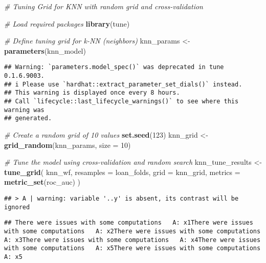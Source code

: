 \documentclass[
]{article}
\newenvironment{Shaded}{\begin{snugshade}}{\end{snugshade}}
\newcommand{\AttributeTok}[1]{\textcolor[rgb]{0.13,0.29,0.53}{#1}}
\newcommand{\CommentTok}[1]{\textcolor[rgb]{0.56,0.35,0.01}{\textit{#1}}}
\newcommand{\DecValTok}[1]{\textcolor[rgb]{0.00,0.00,0.81}{#1}}
\newcommand{\FunctionTok}[1]{\textcolor[rgb]{0.13,0.29,0.53}{\textbf{#1}}}
\newcommand{\NormalTok}[1]{#1}
\newcommand{\OtherTok}[1]{\textcolor[rgb]{0.56,0.35,0.01}{#1}}
\begin{document}
\begin{Shaded}
\begin{Highlighting}[]
\CommentTok{\# Tuning Grid for KNN with random grid and cross{-}validation}

\CommentTok{\# Load required packages}
\FunctionTok{library}\NormalTok{(tune)}

\CommentTok{\# Define tuning grid for k{-}NN (neighbors)}
\NormalTok{knn\_params }\OtherTok{\textless{}{-}} \FunctionTok{parameters}\NormalTok{(knn\_model)}
\end{Highlighting}
\end{Shaded}

\begin{verbatim}
## Warning: `parameters.model_spec()` was deprecated in tune 0.1.6.9003.
## i Please use `hardhat::extract_parameter_set_dials()` instead.
## This warning is displayed once every 8 hours.
## Call `lifecycle::last_lifecycle_warnings()` to see where this warning was
## generated.
\end{verbatim}

\begin{Shaded}
\begin{Highlighting}[]
\CommentTok{\# Create a random grid of 10 values}
\FunctionTok{set.seed}\NormalTok{(}\DecValTok{123}\NormalTok{)}
\NormalTok{knn\_grid }\OtherTok{\textless{}{-}} \FunctionTok{grid\_random}\NormalTok{(knn\_params, }\AttributeTok{size =} \DecValTok{10}\NormalTok{)}

\CommentTok{\# Tune the model using cross{-}validation and random search}
\NormalTok{knn\_tune\_results }\OtherTok{\textless{}{-}} \FunctionTok{tune\_grid}\NormalTok{(}
\NormalTok{  knn\_wf,}
  \AttributeTok{resamples =}\NormalTok{ loan\_folds,}
  \AttributeTok{grid =}\NormalTok{ knn\_grid,}
  \AttributeTok{metrics =} \FunctionTok{metric\_set}\NormalTok{(roc\_auc)}
\NormalTok{)}
\end{Highlighting}
\end{Shaded}

\begin{verbatim}
## > A | warning: variable '..y' is absent, its contrast will be ignored
\end{verbatim}

\begin{verbatim}
## There were issues with some computations   A: x1There were issues with some computations   A: x2There were issues with some computations   A: x3There were issues with some computations   A: x4There were issues with some computations   A: x5There were issues with some computations   A: x5
\end{verbatim}
\end{document}
